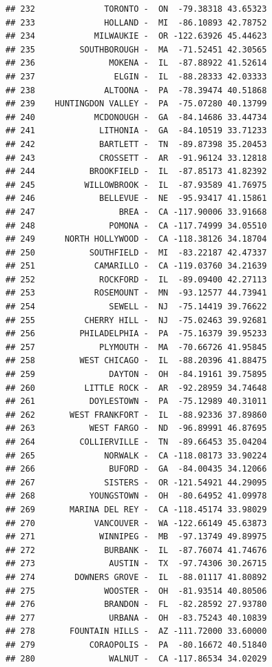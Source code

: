 \documentclass{article}\usepackage[]{graphicx}\usepackage[]{color}
\makeatletter
\newenvironment{kframe}{%
 \def\at@end@of@kframe{}%
 \ifinner\ifhmode%
  \def\at@end@of@kframe{\end{minipage}}%
  \begin{minipage}{\columnwidth}%
 \fi\fi%
 \def\FrameCommand##1{\hskip\@totalleftmargin \hskip-\fboxsep
 \colorbox{shadecolor}{##1}\hskip-\fboxsep
     \hskip-\linewidth \hskip-\@totalleftmargin \hskip\columnwidth}%
 \MakeFramed {\advance\hsize-\width
   \@totalleftmargin\z@ \linewidth\hsize
   \@setminipage}}%
 {\par\unskip\endMakeFramed%
 \at@end@of@kframe}
\newenvironment{knitrout}{}{} %
\makeatother
\begin{document}
\begin{knitrout}
\begin{kframe}
\begin{verbatim}
## 232              TORONTO -  ON  -79.38318 43.65323
## 233              HOLLAND -  MI  -86.10893 42.78752
## 234            MILWAUKIE -  OR -122.63926 45.44623
## 235         SOUTHBOROUGH -  MA  -71.52451 42.30565
## 236               MOKENA -  IL  -87.88922 41.52614
## 237                ELGIN -  IL  -88.28333 42.03333
## 238              ALTOONA -  PA  -78.39474 40.51868
## 239    HUNTINGDON VALLEY -  PA  -75.07280 40.13799
## 240            MCDONOUGH -  GA  -84.14686 33.44734
## 241             LITHONIA -  GA  -84.10519 33.71233
## 242             BARTLETT -  TN  -89.87398 35.20453
## 243             CROSSETT -  AR  -91.96124 33.12818
## 244           BROOKFIELD -  IL  -87.85173 41.82392
## 245          WILLOWBROOK -  IL  -87.93589 41.76975
## 246             BELLEVUE -  NE  -95.93417 41.15861
## 247                 BREA -  CA -117.90006 33.91668
## 248               POMONA -  CA -117.74999 34.05510
## 249      NORTH HOLLYWOOD -  CA -118.38126 34.18704
## 250           SOUTHFIELD -  MI  -83.22187 42.47337
## 251            CAMARILLO -  CA -119.03760 34.21639
## 252             ROCKFORD -  IL  -89.09400 42.27113
## 253            ROSEMOUNT -  MN  -93.12577 44.73941
## 254               SEWELL -  NJ  -75.14419 39.76622
## 255          CHERRY HILL -  NJ  -75.02463 39.92681
## 256         PHILADELPHIA -  PA  -75.16379 39.95233
## 257             PLYMOUTH -  MA  -70.66726 41.95845
## 258         WEST CHICAGO -  IL  -88.20396 41.88475
## 259               DAYTON -  OH  -84.19161 39.75895
## 260          LITTLE ROCK -  AR  -92.28959 34.74648
## 261           DOYLESTOWN -  PA  -75.12989 40.31011
## 262       WEST FRANKFORT -  IL  -88.92336 37.89860
## 263           WEST FARGO -  ND  -96.89991 46.87695
## 264         COLLIERVILLE -  TN  -89.66453 35.04204
## 265              NORWALK -  CA -118.08173 33.90224
## 266               BUFORD -  GA  -84.00435 34.12066
## 267              SISTERS -  OR -121.54921 44.29095
## 268           YOUNGSTOWN -  OH  -80.64952 41.09978
## 269       MARINA DEL REY -  CA -118.45174 33.98029
## 270            VANCOUVER -  WA -122.66149 45.63873
## 271             WINNIPEG -  MB  -97.13749 49.89975
## 272              BURBANK -  IL  -87.76074 41.74676
## 273               AUSTIN -  TX  -97.74306 30.26715
## 274        DOWNERS GROVE -  IL  -88.01117 41.80892
## 275              WOOSTER -  OH  -81.93514 40.80506
## 276              BRANDON -  FL  -82.28592 27.93780
## 277               URBANA -  OH  -83.75243 40.10839
## 278       FOUNTAIN HILLS -  AZ -111.72000 33.60000
## 279           CORAOPOLIS -  PA  -80.16672 40.51840
## 280               WALNUT -  CA -117.86534 34.02029

\end{verbatim}
\end{kframe}
\end{knitrout}
\end{document}

